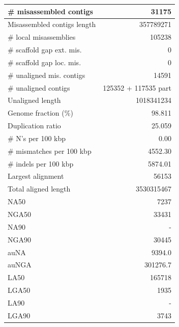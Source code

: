 \documentclass[12pt,a4paper]{article}
\begin{document}
\begin{table}[ht]
\begin{center}
\begin{tabular}{|l*{1}{|r}|}
\# misassembled contigs & 31175 \\ \hline
Misassembled contigs length & 357789271 \\ \hline
\# local misassemblies & 105238 \\ \hline
\# scaffold gap ext. mis. & 0 \\ \hline
\# scaffold gap loc. mis. & 0 \\ \hline
\# unaligned mis. contigs & 14591 \\ \hline
\# unaligned contigs & 125352 + 117535 part \\ \hline
Unaligned length & 1018341234 \\ \hline
Genome fraction (\%) & 98.811 \\ \hline
Duplication ratio & 25.059 \\ \hline
\# N's per 100 kbp & 0.00 \\ \hline
\# mismatches per 100 kbp & 4552.30 \\ \hline
\# indels per 100 kbp & 5874.01 \\ \hline
Largest alignment & 56153 \\ \hline
Total aligned length & 3530315467 \\ \hline
NA50 & 7237 \\ \hline
NGA50 & 33431 \\ \hline
NA90 & - \\ \hline
NGA90 & 30445 \\ \hline
auNA & 9394.0 \\ \hline
auNGA & 301276.7 \\ \hline
LA50 & 165718 \\ \hline
LGA50 & 1935 \\ \hline
LA90 & - \\ \hline
LGA90 & 3743 \\ \hline
\end{tabular}
\end{center}
\end{table}
\end{document}
